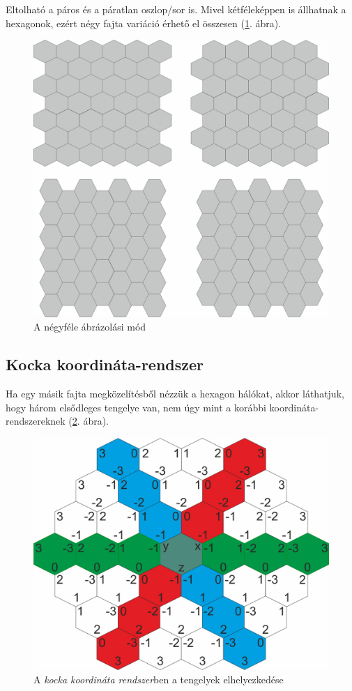 Eltolható a páros és a páratlan oszlop/sor is. Mivel kétféleképpen is állhatnak a hexagonok, ezért négy fajta variáció érhető el összesen (\ref{fig:OffsetFour}. ábra).

\begin{figure}[h!]
\centering
\includegraphics[scale=0.2]{kepek/OffsetFour.jpg}
\caption{A négyféle ábrázolási mód}
\label{fig:OffsetFour}
\end{figure}

\subsection{Kocka koordináta-rendszer}

Ha egy másik fajta megközelítésből nézzük a hexagon hálókat, akkor láthatjuk, hogy három elsődleges tengelye van, nem úgy mint a korábbi koordináta-rendszereknek (\ref{fig:CubeCoord}. ábra). 

\begin{figure}[h!]
\centering
\includegraphics[scale=0.4]{kepek/CubeCoord.jpg}
\caption{A \textit{kocka koordináta rendszer}ben a tengelyek elhelyezkedése}
\label{fig:CubeCoord}
\end{figure}

